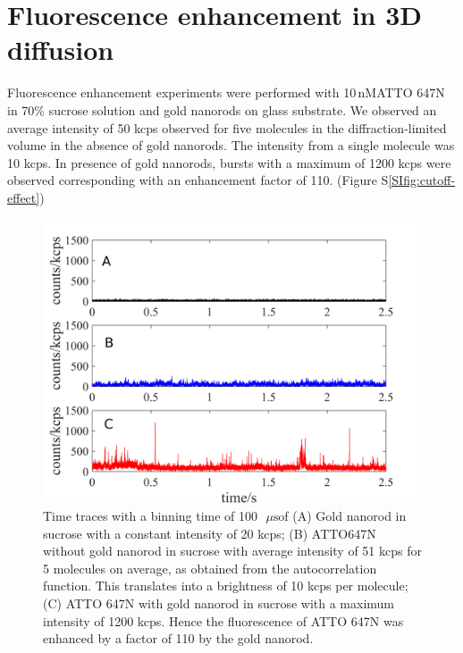 \documentclass[11pt,a4paper,onecolumn]{article}
\newcommand{\nM}{\ensuremath{\,\textrm{nM}}}
\newcommand{\us}{\ensuremath{\,\mu\textrm{s}}}
\begin{document}
\section{Fluorescence enhancement in 3D diffusion}
Fluorescence enhancement experiments were performed with 10\nM ATTO 647N in 70\% sucrose solution and gold nanorods on glass substrate. We observed an average intensity of 50 kcps observed for five molecules in the diffraction-limited volume in the absence of gold nanorods. The intensity from a single molecule was 10 kcps. In presence of gold nanorods, bursts with a maximum of 1200 kcps were observed corresponding with an enhancement factor of 110. (Figure S\ref{SIfig:cutoff-effect})\\
\begin{figure}[ht]
  \centering
  \includegraphics[width=\textwidth]{3D_enhc.png}
  \makeatletter
  \renewcommand{\fnum@figure}{\figurename~S\thefigure}
  \makeatother{}
  \caption{Time traces with a binning time of 100~\us of (A) Gold nanorod in sucrose with a constant intensity of 20 kcps; (B) ATTO647N without gold nanorod in sucrose with average intensity of 51 kcps for 5 molecules on average, as obtained from the autocorrelation function. This translates into a brightness of 10 kcps per molecule; (C) ATTO 647N with gold nanorod in sucrose with a maximum intensity of 1200 kcps. Hence the fluorescence of ATTO 647N was enhanced by a factor of 110 by the gold nanorod.}
  \label{SIfig:3D-enhc}
\end{figure}
\end{document}
